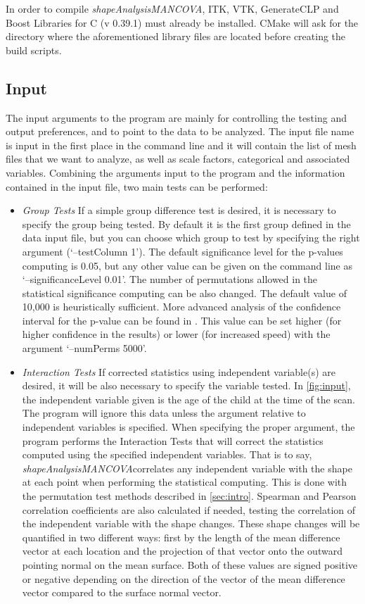 \documentclass{InsightArticle}
\newcommand{\ProgramName}{\textit{shapeAnalysisMANCOVA}}
\begin{document}
In order to compile \ProgramName, ITK, VTK, GenerateCLP and Boost Libraries for C (v 0.39.1) must already be installed. CMake will ask for the directory where the aforementioned library files are located before creating the build scripts. 

\subsection{Input}
\label{sec:inputs}

The input arguments to the program are mainly for controlling the testing and output preferences, and to point to the data to be analyzed. The input file name is input in the first place in the command line and it will contain the list of mesh files that we want to analyze, as well as scale factors, categorical and associated variables. Combining the arguments input to the program and the information contained in the input file, two main tests can be performed:

\begin{itemize}
	\item \textit{Group Tests} If a simple group difference test is desired, it is necessary to specify the group being tested. By default it is the first group defined in the data input file, but you can choose which group to test by specifying the right argument (`--testColumn 1'). The default significance level for the p-values computing is 0.05, but any other value can be given on the command line as `--significanceLevel 0.01'. The number of permutations allowed in the statistical significance computing can be also changed. The default value of 10,000 is heuristically sufficient. More advanced analysis of the confidence interval for the p-value can be found in \cite{Seber04}. This value can be set higher (for higher confidence in the results) or lower (for increased speed) with the argument `--numPerms 5000'. 
	\item \textit{Interaction Tests}  If corrected statistics using independent variable(s) are desired, it will be also necessary to specify the variable tested. In \ref{fig:input}, the independent variable given is the age of the child at the time of the scan. The program will ignore this data unless the argument relative to independent variables is specified. When specifying the proper argument, the program performs the Interaction Tests that will correct the statistics computed using the specified independent variables. That is to say, \ProgramName correlates any independent variable with the shape at each point when performing the statistical computing. This is done with the permutation test methods described in \ref{sec:intro}. Spearman and Pearson correlation coefficients are also calculated if needed, testing the correlation of the independent variable with the shape changes. These shape changes will be quantified in two different ways: first by the length of the mean difference vector at each location and the projection of that vector onto the outward pointing normal on the mean surface. Both of these values are signed positive or negative depending on the direction of the vector of the mean difference vector compared to the surface normal vector.
\end{itemize}
\end{document}
